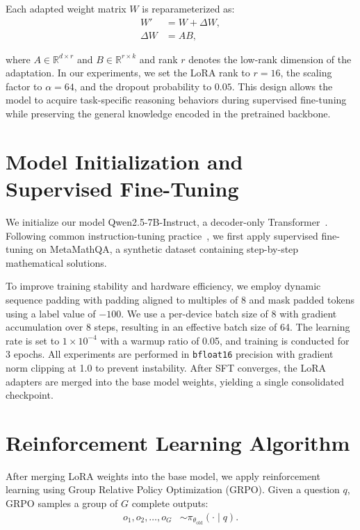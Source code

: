 \documentclass[12pt]{report}
\begin{document}
Each adapted weight matrix $W$ is reparameterized as:
\begin{align}
W' &= W + \Delta W, \\
\Delta W &= AB,
\end{align}

where $A \in \mathbb{R}^{d \times r}$ and $B \in \mathbb{R}^{r \times k}$ and rank $r$ denotes the low-rank dimension of the adaptation. In our experiments, we set the LoRA rank to $r=16$, the scaling factor to $\alpha=64$, and the dropout probability to $0.05$. This design allows the model to acquire task-specific reasoning behaviors during supervised fine-tuning while preserving the general knowledge encoded in the pretrained backbone.

\section{Model Initialization and Supervised Fine-Tuning}
We initialize our model Qwen2.5-7B-Instruct\cite{qwen2025qwen25technicalreport}, a decoder-only Transformer~\cite{vaswani2023attentionneed}. 
Following common instruction-tuning practice~\cite{LanguageModelsareUnsupervisedMultitaskLearners_2019,ouyang2022traininglanguagemodelsfollow}, we first apply supervised fine-tuning on MetaMathQA, a synthetic dataset containing step-by-step mathematical solutions.

To improve training stability and hardware efficiency, we employ dynamic sequence padding with padding aligned to multiples of 8 and mask padded tokens using a label value of $-100$. We use a per-device batch size of 8 with gradient accumulation over 8 steps, resulting in an effective batch size of 64. The learning rate is set to $1 \times 10^{-4}$ with a warmup ratio of 0.05, and training is conducted for 3 epochs. All experiments are performed in \texttt{bfloat16} precision with gradient norm clipping at 1.0 to prevent instability.
After SFT converges, the LoRA adapters are merged into the base model weights, yielding a single consolidated checkpoint. 

\section{Reinforcement Learning Algorithm}
After merging LoRA weights into the base model, we apply reinforcement learning using Group Relative Policy Optimization (GRPO). Given a question $q$, GRPO samples a group of $G$ complete outputs:
\begin{align}
o_1, o_2, \ldots, o_G 
&\sim \pi_{\theta_{\text{old}}}(\cdot \mid q).
\end{align}
\end{document}
